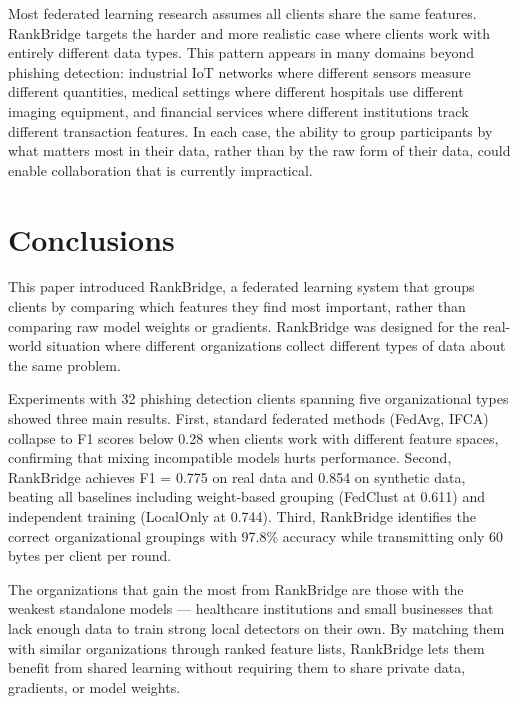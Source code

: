 \documentclass[12pt,a4paper]{article}
\begin{document}
Most federated learning research assumes all clients share the same features. RankBridge targets the harder and more realistic case where clients work with entirely different data types. This pattern appears in many domains beyond phishing detection: industrial IoT networks where different sensors measure different quantities, medical settings where different hospitals use different imaging equipment, and financial services where different institutions track different transaction features. In each case, the ability to group participants by what matters most in their data, rather than by the raw form of their data, could enable collaboration that is currently impractical.

\section{Conclusions}\label{sec:conclusions}

This paper introduced RankBridge, a federated learning system that groups clients by comparing which features they find most important, rather than comparing raw model weights or gradients. RankBridge was designed for the real-world situation where different organizations collect different types of data about the same problem.

Experiments with 32 phishing detection clients spanning five organizational types showed three main results. First, standard federated methods (FedAvg, IFCA) collapse to F1 scores below 0.28 when clients work with different feature spaces, confirming that mixing incompatible models hurts performance. Second, RankBridge achieves F1 = 0.775 on real data and 0.854 on synthetic data, beating all baselines including weight-based grouping (FedClust at 0.611) and independent training (LocalOnly at 0.744). Third, RankBridge identifies the correct organizational groupings with 97.8\% accuracy while transmitting only 60 bytes per client per round.

The organizations that gain the most from RankBridge are those with the weakest standalone models --- healthcare institutions and small businesses that lack enough data to train strong local detectors on their own. By matching them with similar organizations through ranked feature lists, RankBridge lets them benefit from shared learning without requiring them to share private data, gradients, or model weights.
\end{document}
